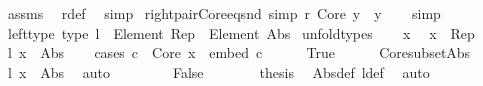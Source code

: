 \begin{isabellebody}
\ assms\ \isamarkupfalse%
\ r{\isacharunderscore}{\kern0pt}def\ \isamarkupfalse%
\ simp%
\endisatagproof
{\isafoldproof}%
%
\isadelimproof
\isanewline
%
\endisadelimproof
\isanewline
{}\isamarkupfalse%
\ right{\isacharunderscore}{\kern0pt}pair{\isacharunderscore}{\kern0pt}Core{\isacharunderscore}{\kern0pt}eq{\isacharunderscore}{\kern0pt}snd\ {\isacharbrackleft}{\kern0pt}simp{\isacharbrackright}{\kern0pt}{\isacharcolon}{\kern0pt}\ {\isachardoublequoteopen}r\ {\isasymlangle}Core{\isacharcomma}{\kern0pt}\ y{\isasymrangle}\ {\isacharequal}{\kern0pt}\ y{\isachardoublequoteclose}\isanewline
%
\isadelimproof
\ \ %
\endisadelimproof
%
\isatagproof
{}\isamarkupfalse%
\ simp%
\endisatagproof
{\isafoldproof}%
%
\isadelimproof
\isanewline
%
\endisadelimproof
\isanewline
{}\isamarkupfalse%
\ left{\isacharunderscore}{\kern0pt}type\ {\isacharbrackleft}{\kern0pt}type{\isacharbrackright}{\kern0pt}{\isacharcolon}{\kern0pt}\ {\isachardoublequoteopen}l\ {\isacharcolon}{\kern0pt}\ Element\ Rep\ {\isasymRightarrow}\ Element\ Abs{\isachardoublequoteclose}\isanewline
%
\isadelimproof
%
\endisadelimproof
%
\isatagproof
{}\isamarkupfalse%
\ unfold{\isacharunderscore}{\kern0pt}types\isanewline
\ \ \isamarkupfalse%
\ x\ \isamarkupfalse%
\ {\isachardoublequoteopen}x\ {\isasymin}\ Rep{\isachardoublequoteclose}\isanewline
\ \ \isamarkupfalse%
\ {\isachardoublequoteopen}l\ x\ {\isasymin}\ Abs{\isachardoublequoteclose}\isanewline
\ \ \isamarkupfalse%
\ {\isacharparenleft}{\kern0pt}cases\ {\isachardoublequoteopen}{\isasymexists}c\ {\isasymin}\ Core{\isachardot}{\kern0pt}\ x\ {\isacharequal}{\kern0pt}\ embed\ c{\isachardoublequoteclose}{\isacharparenright}{\kern0pt}\isanewline
\ \ \ \ \isamarkupfalse%
\ True\isanewline
\ \ \ \ \isamarkupfalse%
\ Core{\isacharunderscore}{\kern0pt}subset{\isacharunderscore}{\kern0pt}Abs\ \isamarkupfalse%
\ {\isachardoublequoteopen}l\ x\ {\isasymin}\ Abs{\isachardoublequoteclose}\ \isamarkupfalse%
\ auto\isanewline
\ \ \isamarkupfalse%
\isanewline
\ \ \ \ \isamarkupfalse%
\ False\isanewline
\ \ \ \ \isamarkupfalse%
\ \isamarkupfalse%
\ {\isacharquery}{\kern0pt}thesis\ \isamarkupfalse%
\ Abs{\isacharunderscore}{\kern0pt}def\ l{\isacharunderscore}{\kern0pt}def\ \isamarkupfalse%
\ auto\isanewline
\ \ \isamarkupfalse%

\end{isabellebody}
